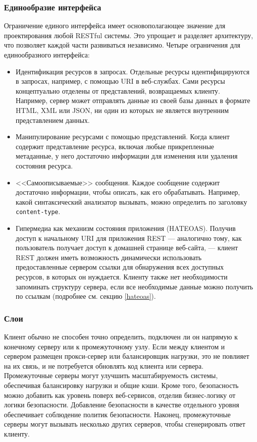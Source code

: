 \documentclass[a4page]{article}
\begin{document}
\subsubsection{Единообразие интерфейса}
Ограничение единого интерфейса имеет основополагающее значение для проектирования любой RESTful системы.
Это упрощает и разделяет архитектуру, что позволяет каждой части развиваться независимо.
Четыре ограничения для единообразного интерфейса:

\begin{itemize}
	\item Идентификация ресурсов в запросах.
	      Отдельные ресурсы идентифицируются в запросах, например, с помощью URI в веб-службах.
	      Сами ресурсы концептуально отделены от представлений, возвращаемых клиенту.
	      Например, сервер может отправлять данные из своей базы данных в формате HTML,
	      XML или JSON, ни один из которых не является внутренним представлением данных.
	\item Манипулирование ресурсами с помощью представлений.
	      Когда клиент содержит представление ресурса, включая любые прикрепленные метаданные,
	      у него достаточно информации для изменения или удаления состояния ресурса.
	\item <<Самоописываемые>> сообщения.
	      Каждое сообщение содержит достаточно информации, чтобы описать, как его обрабатывать.
	      Например, какой синтаксический анализатор вызывать,
	      можно определить по заголовку \texttt{content-type}.
	\item Гипермедиа как механизм состояния приложения (HATEOAS).
	      Получив доступ к начальному URI для приложения REST --- аналогично тому,
	      как пользователь получает доступ к домашней странице веб-сайта, ---
	      клиент REST должен иметь возможность динамически использовать предоставленные сервером ссылки
	      для обнаружения всех доступных ресурсов, в которых он нуждается.
	      Клиенту также нет необходимости запоминать структуру сервера,
	      если все необходимые данные можно получить по ссылкам (подробнее см. секцию \ref{hateoas}).
\end{itemize}

\subsubsection{Слои}
Клиент обычно не способен точно определить,
подключен ли он напрямую к конечному серверу или к промежуточному узлу.
Если между клиентом и сервером размещен прокси-сервер или балансировщик нагрузки,
это не повлияет на их связь, и не потребуется обновлять код клиента или сервера.
Промежуточные серверы могут улучшить масштабируемость системы,
обеспечивая балансировку нагрузки и общие кэши.
Кроме того, безопасность можно добавить как уровень поверх веб-сервисов,
отделив бизнес-логику от логики безопасности.
Добавление безопасности в качестве отдельного уровня обеспечивает соблюдение политик безопасности.
Наконец, промежуточные серверы могут вызывать несколько других серверов, чтобы сгенерировать ответ клиенту.
\end{document}
